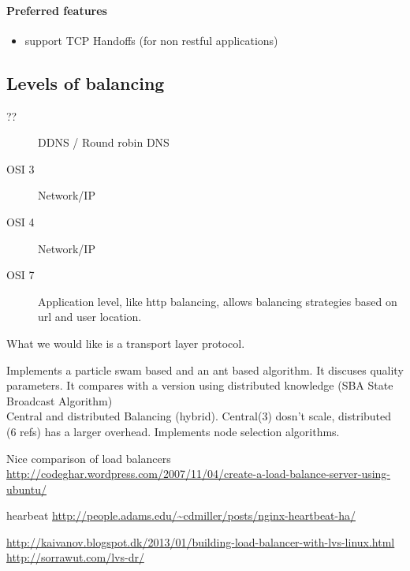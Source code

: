 \paragraph{Preferred features}
\begin{itemize}
	\item support TCP Handoffs (for non restful applications)
\end{itemize}

\subsection{Levels of balancing}
\begin{description}
	\item[??] DDNS / Round robin DNS
	\item[OSI 3] Network/IP %
	\item[OSI 4] Network/IP
	\item[OSI 7] {Application level, like http balancing, allows balancing strategies based on url and user location.}
\end{description}

What we would like is a transport layer protocol.
\vspace{1cm}

\noindent\cite{Ludwig:SwarmIntelligenceGridLoadBalancing} 
Implements a particle swam based and an ant based algorithm. 
It discuses quality parameters.
It compares with a version using distributed knowledge (SBA State Broadcast Algorithm)
\\

\noindent\cite{MayuriMehta:HybridDynamicLB} Central and distributed Balancing (hybrid). Central(3) dosn't scale, distributed (6 refs) has a larger overhead. Implements node selection algorithms.

Nice comparison of load balancers
\url{http://codeghar.wordpress.com/2007/11/04/create-a-load-balance-server-using-ubuntu/}

hearbeat 	\url{http://people.adams.edu/~cdmiller/posts/nginx-heartbeat-ha/}

\url{http://kaivanov.blogspot.dk/2013/01/building-load-balancer-with-lvs-linux.html}
\url{http://sorrawut.com/lvs-dr/}

